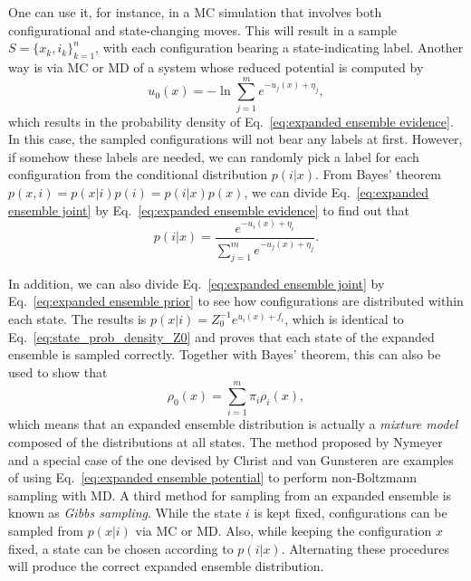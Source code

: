 \documentclass[aip,jcp,reprint,amsmath,amssymb]{revtex4-1}
\begin{document}
One can use it, for instance, in a MC simulation that involves both configurational and state-changing moves.\cite{Lyubartsev_1992} This will result in a sample $S = \{x_k,i_k\}_{k=1}^n$, with each configuration bearing a state-indicating label. Another way is via MC or MD of a system whose reduced potential is computed by
\begin{equation}
\label{eq:expanded ensemble potential}
u_0(x) = - \ln \sum_{j=1}^m e^{-u_j(x) + \eta_j},
\end{equation}
which results in the probability density of Eq.~\eqref{eq:expanded ensemble evidence}. In this case, the sampled configurations will not bear any labels at first. However, if somehow these labels are needed, we can randomly pick a label for each configuration from the conditional distribution $p(i|x)$.\cite{Nymeyer_2010} From Bayes' theorem $p(x,i) = p(x|i) p(i) = p(i|x) p(x)$, we can divide Eq.~\eqref{eq:expanded ensemble joint} by Eq.~\eqref{eq:expanded ensemble evidence} to find out that
\begin{equation}
\label{eq:expanded ensemble posterior}
p(i|x) = \frac{e^{-u_i(x) + \eta_i}}{\sum_{j=1}^m e^{-u_j(x) + \eta_j}}.
\end{equation}

In addition, we can also divide Eq.~\eqref{eq:expanded ensemble joint} by Eq.~\eqref{eq:expanded ensemble prior} to see how configurations are distributed within each state. The results is $p(x|i) = Z_0^{-1} e^{u_i(x) + f_i}$, which is identical to Eq.~\eqref{eq:state_prob_density_Z0} and proves that each state of the expanded ensemble is sampled correctly. Together with Bayes' theorem, this can also be used to show that
\begin{equation}
\label{eq:mixture ensemble}
\rho_0(x) = \sum_{i=1}^m \pi_i \rho_i(x),
\end{equation}
which means that an expanded ensemble distribution is actually a \textit{mixture model}\cite{Lindsay_1995, Marin_2005} composed of the distributions at all states. The method proposed by Nymeyer\cite{Nymeyer_2010} and a special case of the one devised by Christ and van Gunsteren\cite{Christ_2007, *Christ_2008, *Christ_2009} are examples of using Eq.~\eqref{eq:expanded ensemble potential} to perform non-Boltzmann sampling with MD. A third method for sampling from an expanded ensemble is known as \textit{Gibbs sampling}.\cite{Marin_2005, Chodera_2011} While the state $i$ is kept fixed, configurations can be sampled from $p(x|i)$ via MC or MD. Also, while keeping the configuration $x$ fixed, a state can be chosen according to $p(i|x)$. Alternating these procedures will produce the correct expanded ensemble distribution.\cite{Chodera_2011}
\end{document}
